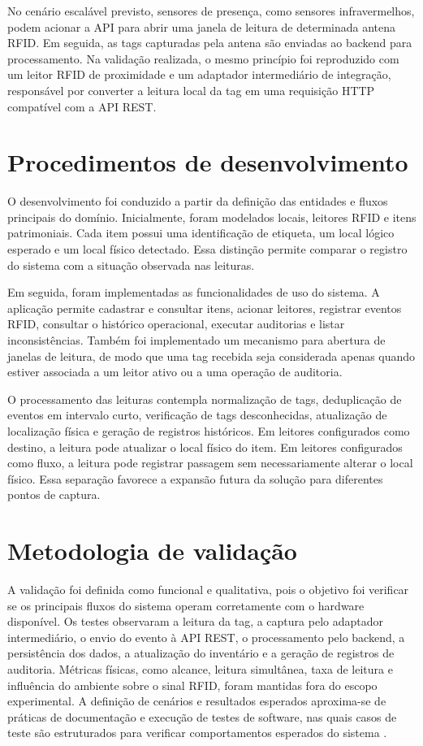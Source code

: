 No cenário escalável previsto, sensores de presença, como sensores infravermelhos, podem acionar a API para abrir uma janela de leitura de determinada antena RFID. Em seguida, as tags capturadas pela antena são enviadas ao backend para processamento. Na validação realizada, o mesmo princípio foi reproduzido com um leitor RFID de proximidade e um adaptador intermediário de integração, responsável por converter a leitura local da tag em uma requisição HTTP compatível com a API REST.

\section{Procedimentos de desenvolvimento}

O desenvolvimento foi conduzido a partir da definição das entidades e fluxos principais do domínio. Inicialmente, foram modelados locais, leitores RFID e itens patrimoniais. Cada item possui uma identificação de etiqueta, um local lógico esperado e um local físico detectado. Essa distinção permite comparar o registro do sistema com a situação observada nas leituras.

Em seguida, foram implementadas as funcionalidades de uso do sistema. A aplicação permite cadastrar e consultar itens, acionar leitores, registrar eventos RFID, consultar o histórico operacional, executar auditorias e listar inconsistências. Também foi implementado um mecanismo para abertura de janelas de leitura, de modo que uma tag recebida seja considerada apenas quando estiver associada a um leitor ativo ou a uma operação de auditoria.

O processamento das leituras contempla normalização de tags, deduplicação de eventos em intervalo curto, verificação de tags desconhecidas, atualização de localização física e geração de registros históricos. Em leitores configurados como destino, a leitura pode atualizar o local físico do item. Em leitores configurados como fluxo, a leitura pode registrar passagem sem necessariamente alterar o local físico. Essa separação favorece a expansão futura da solução para diferentes pontos de captura.

\section{Metodologia de validação}

A validação foi definida como funcional e qualitativa, pois o objetivo foi verificar se os principais fluxos do sistema operam corretamente com o hardware disponível. Os testes observaram a leitura da tag, a captura pelo adaptador intermediário, o envio do evento à API REST, o processamento pelo backend, a persistência dos dados, a atualização do inventário e a geração de registros de auditoria. Métricas físicas, como alcance, leitura simultânea, taxa de leitura e influência do ambiente sobre o sinal RFID, foram mantidas fora do escopo experimental. A definição de cenários e resultados esperados aproxima-se de práticas de documentação e execução de testes de software, nas quais casos de teste são estruturados para verificar comportamentos esperados do sistema \cite{iso29119}.

